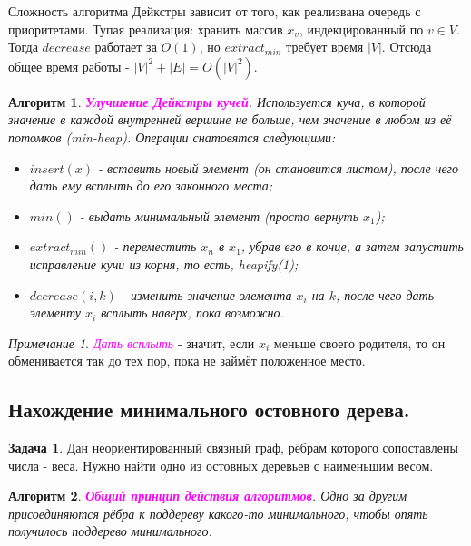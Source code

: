 \documentclass[a4paper]{article}
\theoremstyle{indented}
\newtheorem{alg}{Алгоритм}
\theoremstyle{definition}
\newtheorem{prob}{Задача}
\theoremstyle{remark}
\newtheorem{remark}{Примечание}
\begin{document}
Сложность алгоритма Дейкстры зависит от того, как реализвана очередь с приоритетами. Тупая реализация: хранить массив $x_v$, индекцированный по $v\in V$. Тогда $decrease$ работает за $O(1)$, но $extract_{min}$ требует время $|V|$. Отсюда общее время работы - $|V|^2+|E|=O(|V|^2)$. \\

\begin{alg}
    \textcolor{magenta}{\hypertarget{t16}{\textbf{Улучшение Дейкстры кучей}}}. Используется куча, в которой значение в каждой внутренней вершине не больше, чем значение в любом из её потомков (min-heap). Операции снатовятся следующими:

    \begin{itemize}
        \item $insert(x)$ - вставить новый элемент (он становится листом), после чего дать ему всплыть до его законного места; 
        \item $min()$ - выдать минимальный элемент (просто вернуть $x_1$); 
        \item $extract_{min}()$ - переместить $x_n$ в $x_1$, убрав его в конце, а затем запустить исправление кучи из корня, то есть, heapify(1); 
        \item $decrease(i, k)$ - изменить значение элемента $x_i$ на $k$, после чего дать элементу $x_i$ всплыть наверх, пока возможно. 
    \end{itemize}
\end{alg}

\begin{remark}
    \textcolor{magenta}{\hypertarget{d4}{\textit{Дать всплыть}}} - значит, если $x_i$ меньше своего родителя, то он обменивается так до тех пор, пока не займёт положенное место.
\end{remark}

\subsection{Нахождение минимального остовного дерева.}

\begin{prob}
    Дан неориентированный связный граф, рёбрам которого сопоставлены числа - веса. Нужно найти одно из остовных деревьев с наименьшим весом.
\end{prob}

\begin{alg}
    \textcolor{magenta}{\hypertarget{t17}{\textbf{Общий принцип действия алгоритмов}}}. Одно за другим присоединяются рёбра к поддереву какого-то минимального, чтобы опять получилось поддерево минимального.
\end{alg}
\end{document}
